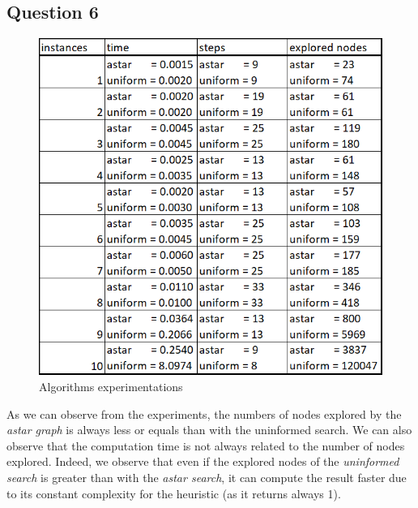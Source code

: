 \documentclass[a4paper,11pt]{article}
\begin{document}
	\subsection{Question 6}
		\begin{figure}[h!]
			\centering
    		\includegraphics[width=\linewidth]{experiments}
    		\caption{Algorithms experimentations}
		\end{figure}
		\par As we can observe from the experiments, the numbers of nodes explored by the \textit{astar graph} is always less or equals than with the uninformed search. We can also observe that the computation time is not always related to the number of nodes explored. Indeed, we observe that even if the explored nodes of the \textit{uninformed search} is greater than with the \textit{astar search}, it can compute the result faster due to its constant complexity for the heuristic (as it returns always 1).
\end{document}
